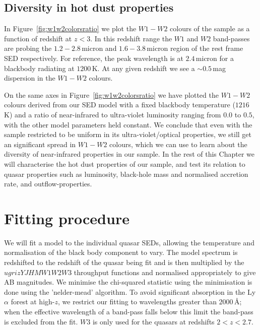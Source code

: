 \subsection{Diversity in hot dust properties}

In Figure~\ref{fig:w1w2colorsratio} we plot the $W1 - W2$ colours of the sample as a function of redshift at $z<3$. 
In this redshift range the $W1$ and $W2$ band-passes are probing the $1.2 - 2.8$\,micron and $1.6 - 3.8$\,micron region of the rest frame SED respectively. 
For reference, the peak wavelength is at $2.4$\,micron for a blackbody radiating at $1200$\,K. 
At any given redshift we see a $\sim 0.5$\,mag dispersion in the $W1-W2$ colours. 

On the same axes in Figure~\ref{fig:w1w2colorsratio} we have plotted the $W1-W2$ colours derived from our SED model with a fixed blackbody temperature ($1216$\,K) and a ratio of near-infrared to ultra-violet luminosity ranging from $0.0$ to $0.5$, with the other model parameters held constant. 
We conclude that even with the sample restricted to be uniform in its ultra-violet/optical properties, we still get an significant spread in $W1-W2$ colours, which we can use to learn about the diversity of near-infrared properties in our sample. 
In the rest of this Chapter we will characterise the hot dust properties of our sample, and test its relation to quasar properties such as luminosity, black-hole mass and normalised accretion rate, and outflow-properties. 

\section{Fitting procedure}

We will fit a model to the individual quasar SEDs, allowing the temperature and normalisation of the black body component to vary. 
The model spectrum is redshifted to the redshift of the quasar being fit and is then multiplied by the $ugrizYJHMW1W2W3$ throughput functions and normalised appropriately to give AB magnitudes. 
We minimise the chi-squared statistic using the minimisation is done using the 'nelder-mead' algorithm.
To avoid significant absorption in the Ly$\alpha$ forest at high-$z$, we restrict our fitting to wavelengths greater than $2000$\,\AA; when the effective wavelength of a band-pass falls below this limit the band-pass is excluded from the fit. 
$W3$ is only used for the quasars at redshifts $2 < z < 2.7$. 

